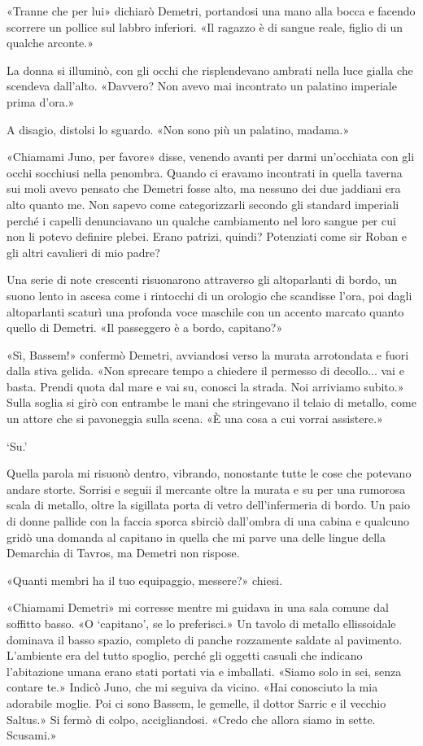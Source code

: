 «Tranne che per lui» dichiarò Demetri, portandosi una mano alla bocca e
facendo scorrere un pollice sul labbro inferiori. «Il ragazzo è di
sangue reale, figlio di un qualche arconte.»

La donna si illuminò, con gli occhi che risplendevano ambrati nella luce
gialla che scendeva dall'alto. «Davvero? Non avevo mai incontrato un
palatino imperiale prima d'ora.»

A disagio, distolsi lo sguardo. «Non sono più un palatino, madama.»

«Chiamami Juno, per favore» disse, venendo avanti per darmi un'occhiata
con gli occhi socchiusi nella penombra. Quando ci eravamo incontrati in
quella taverna sui moli avevo pensato che Demetri fosse alto, ma nessuno
dei due jaddiani era alto quanto me. Non sapevo come categorizzarli
secondo gli standard imperiali perché i capelli denunciavano un qualche
cambiamento nel loro sangue per cui non li potevo definire plebei. Erano
patrizi, quindi? Potenziati come sir Roban e gli altri cavalieri di mio
padre?

Una serie di note crescenti risuonarono attraverso gli altoparlanti di
bordo, un suono lento in ascesa come i rintocchi di un orologio che
scandisse l'ora, poi dagli altoparlanti scaturì una profonda voce
maschile con un accento marcato quanto quello di Demetri. «Il passeggero
è a bordo, capitano?»

«Sì, Bassem!» confermò Demetri, avviandosi verso la murata arrotondata e
fuori dalla stiva gelida. «Non sprecare tempo a chiedere il permesso di
decollo... vai e basta. Prendi quota dal mare e vai su, conosci la
strada. Noi arriviamo subito.» Sulla soglia si girò con entrambe le mani
che stringevano il telaio di metallo, come un attore che si pavoneggia
sulla scena. «È una cosa a cui vorrai assistere.»

`Su.'

Quella parola mi risuonò dentro, vibrando, nonostante tutte le cose che
potevano andare storte. Sorrisi e seguii il mercante oltre la murata e
su per una rumorosa scala di metallo, oltre la sigillata porta di vetro
dell'infermeria di bordo. Un paio di donne pallide con la faccia sporca
sbirciò dall'ombra di una cabina e qualcuno gridò una domanda al
capitano in quella che mi parve una delle lingue della Demarchia di
Tavros, ma Demetri non rispose.

«Quanti membri ha il tuo equipaggio, messere?» chiesi.

«Chiamami Demetri» mi corresse mentre mi guidava in una sala comune dal
soffitto basso. «O `capitano', se lo preferisci.» Un tavolo di metallo
ellissoidale dominava il basso spazio, completo di panche rozzamente
saldate al pavimento. L'ambiente era del tutto spoglio, perché gli
oggetti casuali che indicano l'abitazione umana erano stati portati via
e imballati. «Siamo solo in sei, senza contare te.» Indicò Juno, che mi
seguiva da vicino. «Hai conosciuto la mia adorabile moglie. Poi ci sono
Bassem, le gemelle, il dottor Sarric e il vecchio Saltus.» Si fermò di
colpo, accigliandosi. «Credo che allora siamo in sette. Scusami.»


